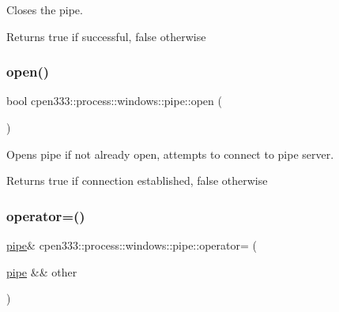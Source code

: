 Closes the pipe. 

\begin{DoxyReturn}{Returns}
true if successful, false otherwise 
\end{DoxyReturn}
\mbox{\label{classcpen333_1_1process_1_1windows_1_1pipe_a25b30161d315cfd4ad1b9fdaf55d56b0}} 
\subsubsection{\texorpdfstring{open()}{open()}}
{\footnotesize\ttfamily bool cpen333\+::process\+::windows\+::pipe\+::open (\begin{DoxyParamCaption}{ }\end{DoxyParamCaption})\hspace{0.3cm}{\ttfamily [inline]}}



Opens pipe if not already open, attempts to connect to pipe server. 

\begin{DoxyReturn}{Returns}
true if connection established, false otherwise 
\end{DoxyReturn}
\mbox{\label{classcpen333_1_1process_1_1windows_1_1pipe_a8e99292210a457c3c03f268fabd74e77}} 
\subsubsection{\texorpdfstring{operator=()}{operator=()}}
{\footnotesize\ttfamily \hyperlink{classcpen333_1_1process_1_1windows_1_1pipe}{pipe}\& cpen333\+::process\+::windows\+::pipe\+::operator= (\begin{DoxyParamCaption}\item[{\hyperlink{classcpen333_1_1process_1_1windows_1_1pipe}{pipe} \&\&}]{other }\end{DoxyParamCaption})\hspace{0.3cm}{\ttfamily [inline]}}



